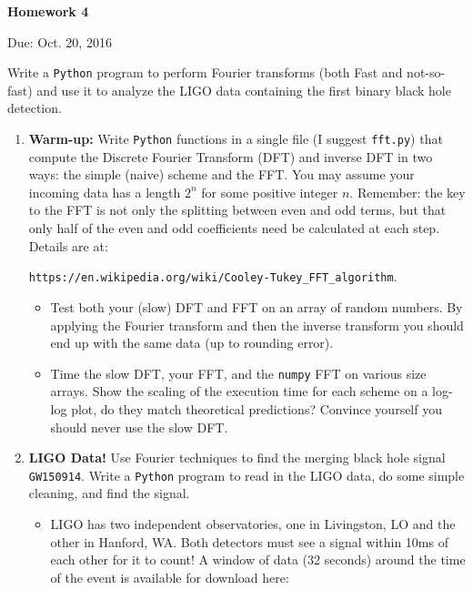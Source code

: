 \documentclass{article}
\newcommand{\Python}{{\texttt{Python}}}
\begin{document}
\begin{center}

\vspace*{-2.5cm}
\LARGE
\bf{Homework 4}
\vspace{1cm}

\large{Due: Oct. 20, 2016}
\vspace{1cm}

\end{center}

Write a \Python{} program to perform Fourier transforms (both Fast and not-so-fast) and use it to analyze the LIGO data containing the first binary black hole detection.

\begin{enumerate}
	\item {\bf Warm-up:} Write \Python{} functions in a single file (I suggest \texttt{fft.py}) that compute the Discrete Fourier Transform (DFT) and inverse DFT in two ways: the simple (naive) scheme and the FFT.  You may assume your incoming data has a length $2^n$ for some positive integer $n$.  Remember: the key to the FFT is not only the splitting between even and odd terms, but that only half of the even and odd coefficients need be calculated at each step.  Details are at: 
	
	\texttt{https://en.wikipedia.org/wiki/Cooley-Tukey\_FFT\_algorithm}.
		\begin{itemize}
			\item Test both your (slow) DFT and FFT on an array of random numbers. By applying the Fourier transform and then the inverse transform you should end up with the same data (up to rounding error).
			\item Time the slow DFT, your FFT, and the \texttt{numpy} FFT on various size arrays. Show the scaling of the execution time for each scheme on a log-log plot, do they match theoretical predictions?  Convince yourself you should never use the slow DFT.
		\end{itemize}
	\item {\bf LIGO Data! }  Use Fourier techniques to find the merging black hole signal \texttt{GW150914}.  Write a \Python{} program to read in the LIGO data, do some simple cleaning, and find the signal.
		\begin{itemize}
			\item LIGO has two independent observatories, one in Livingston, LO and the other in Hanford, WA. Both detectors must see a signal within 10ms of each other for it to count! A window of data (32 seconds) around the time of the event is available for download here:  
			

\end{itemize}
\end{enumerate}
\end{document}
